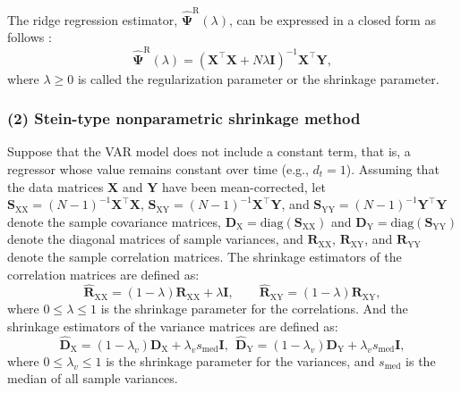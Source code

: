 The ridge regression estimator,
\(\widehat{ \boldsymbol\Psi }^\text{R} (\lambda)\), can be expressed in a
closed form as follows \citep{Hoerl70}:
\begin{equation}
    \widehat{ \boldsymbol\Psi }^\text{R} (\lambda) =
    \left( \mathbf{X}^\top \mathbf{X} + N \lambda \mathbf{I} \right)^{-1} \mathbf{X}^\top \mathbf{Y},
    \end{equation}
where \(\lambda \geq 0\) is called the regularization parameter or the
shrinkage parameter.

\subsubsection{(2) Stein-type nonparametric shrinkage method}\label{stein-type-nonparametric-shrinkage-method}

Suppose that the VAR model does not include a constant term, that is, a regressor whose value remains constant over time (e.g., \(d_t = 1\)).
Assuming that the data matrices \(\mathbf{X}\) and \(\mathbf{Y}\) have been mean-corrected,
let \(\mathbf{S}_\text{XX} = (N - 1)^{-1} \mathbf{X}^\top \mathbf{X}\),
\(\mathbf{S}_\text{XY} = (N - 1)^{-1} \mathbf{X}^\top \mathbf{Y}\), and
\(\mathbf{S}_\text{YY} = (N - 1)^{-1} \mathbf{Y}^\top \mathbf{Y}\) denote the sample covariance matrices, \(\mathbf{D}_\text{X} = \text{diag}(\mathbf{S}_\text{XX})\) and \(\mathbf{D}_\text{Y} = \text{diag}(\mathbf{S}_\text{YY})\) denote the diagonal matrices of sample variances, and \(\mathbf{R}_\text{XX}\), \(\mathbf{R}_\text{XY}\), and \(\mathbf{R}_\text{YY}\) denote the sample correlation matrices.
The shrinkage estimators of the correlation matrices are defined as:
\begin{equation}
    \widehat{\mathbf{R}}_\text{XX} =
    (1-\lambda) \mathbf{R}_\text{XX} + \lambda \mathbf{I}
    ,
    \qquad
    \widehat{\mathbf{R}}_\text{XY} =
    (1-\lambda) \mathbf{R}_\text{XY},
\end{equation}
where \(0 \leq \lambda \leq 1\) is the shrinkage parameter for the correlations.
And the shrinkage estimators of the variance matrices are defined as:
\begin{equation}
    \widehat{\mathbf{D}}_\text{X} = 
    (1-\lambda_v) \mathbf{D}_\text{X}  +
    \lambda_v s_\text{med} \mathbf{I},
    \ \ \widehat{\mathbf{D}}_\text{Y} =
        (1-\lambda_v) \mathbf{D}_{\text{Y}} +
    \lambda_v s_\text{med} \mathbf{I},
\end{equation}
where \(0 \leq \lambda_v \leq 1\) is the shrinkage parameter for the variances,
and \(s_\text{med}\) is the median of all sample variances.

